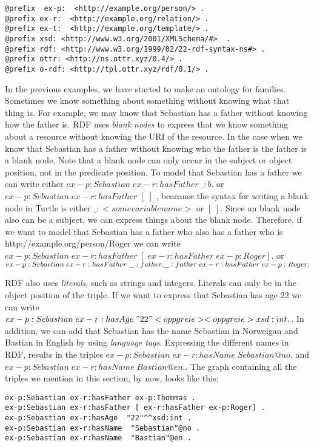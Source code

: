 \begin{lstlisting}[frame=single, language=turtle]
@prefix  ex-p:  <http://example.org/person/> . 
@prefix ex-r:  <http://example.org/relation/> . 
@prefix ex-t:  <http://example.org/template/> . 
@prefix xsd: <http://www.w3.org/2001/XMLSchema/#>  . 
@prefix rdf: <http://www.w3.org/1999/02/22-rdf-syntax-ns#> .
@prefix ottr: <http://ns.ottr.xyz/0.4/> .
@prefix o-rdf: <http://tpl.ottr.xyz/rdf/0.1/> .
\end{lstlisting}

\para
In the previous examples, we have started to make an ontology for families. Sometimes we know something about something without knowing what that thing is. For example, we may know that Sebastian has a father without knowing how the father is. RDF uses \emph{blank nodes} to express that we know something about a resource without knowing the URI of the resource. In the case when we know that Sebastian has a father without knowing who the father is the father is a blank node. Note that a blank node can only  occur in the subject or object position, not in the predicate position. To model that Sebastian has a father we can write either $ex-p:Sebastian\; ex-r:hasFather\; \_:b .$ or $ex-p:Sebastian\; ex-r:hasFather\; [\; ]$ , beacause the syntax for writing a blank node in Turtle is either $\_:<some variable name>$ or $[\; ]$. Since an blank node also can be a subject, we can express things about the blank node. Therefore, if we want to model that Sebastian has a father who also has a father who is http://example.org/person/Roger we can write $ex-p:Sebastian\; ex-r:hasFather\; [\; ex-r:hasFather\; ex-p:Roger] .$ or $ex-p:Sebastian\; ex-r:hasFather\; \_:father . \\ \_:father \; ex-r:hasFather\; ex-p:Roger .$

\para
RDF also uses \emph{literals}, such as strings and integers. Literals can only be in the object position of the triple. If we want to express that Sebastian has age 22 we can write $ex-p:Sebastian\; ex-r:hasAge\; " 22 " <opp greie> <opp greie> xsd:int.$. In addition, we can add that Sebastian has the name Sebastian in Norweigan and Bastian in English by using \emph{language tags}. Expressing the different names in RDF, results in the triples $ex-p:Sebastian\; ex-r:hasName\; Sebastian@no.$ and $ex-p:Sebastian\; ex-r:hasName\; Bastian@en.$. The graph containing all the triples we mention in this section, by now, looks like this:

\begin{lstlisting}[frame=single, language=turtle]
ex-p:Sebastian ex-r:hasFather ex-p:Thommas .
ex-p:Sebastian ex-r:hasFather [ ex-r:hasFather ex-p:Roger] . 
ex-p:Sebastian ex-r:hasAge  "22"^^xsd:int . 
ex-p:Sebastian ex-r:hasName  "Sebastian"@no . 
ex-p:Sebastian ex-r:hasName  "Bastian"@en .
\end{lstlisting}

